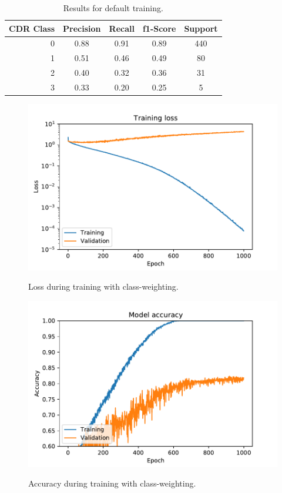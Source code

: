 \documentclass{kththesis}
\begin{document}
\begin{table}[h]
  \begin{center}
    \caption{Results for default training. \label{tab:results_class_weighted}}
    \begin{tabular}{r|ccc|c}
      \textbf{CDR Class} & \textbf{Precision} & \textbf{Recall} & \textbf{f1-Score} & \textbf{Support} \\
      \toprule
      0 & 0.88 & 0.91 & 0.89 & 440 \\
      1 & 0.51 & 0.46 & 0.49 & 80  \\
      2 & 0.40 & 0.32 & 0.36 & 31  \\
      3 & 0.33 & 0.20 & 0.25 & 5   \\
    \end{tabular}
  \end{center}
\end{table}
\begin{figure}
  \centering
  \includegraphics[width=0.9\linewidth]{img/loss_class_weighted.pdf}
  \label{fig:loss_default}
  \caption{Loss during training with class-weighting.}
\end{figure}
\begin{figure}
  \centering
  \includegraphics[width=0.9\linewidth]{img/accuracy_class_weighted.pdf}
  \label{fig:accuracy_default}
  \caption{Accuracy during training with class-weighting.}
\end{figure}
\end{document}
